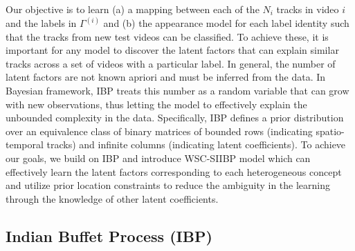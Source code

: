\documentclass[runningheads]{llncs}
\begin{document}
Our objective is to learn (a) a mapping between each of the $N_i$ tracks in video $i$ and the labels in $\Gamma^{(i)}$ and (b) the appearance model for each label identity such that the tracks from new test videos can be classified. To achieve these, it is important for any model to discover the latent factors that can explain similar tracks across a set of videos with a particular label.
In general, the number of latent factors are not known apriori and must be inferred from the data. In Bayesian framework, IBP treats this number as a random variable that can grow with new observations, thus letting the model to effectively explain the unbounded complexity in the data. Specifically, IBP defines a prior distribution over an equivalence class of binary matrices of bounded rows (indicating spatio-temporal tracks) and infinite columns (indicating latent coefficients). To achieve our goals, we build on IBP and introduce WSC-SIIBP model which can effectively learn the latent factors corresponding to each  heterogeneous concept and utilize prior location constraints to reduce the ambiguity in the learning through the knowledge of other latent coefficients.

\vspace{-3mm}
\subsection{Indian Buffet Process (IBP)}
\label{sssec:sibp}
\end{document}
